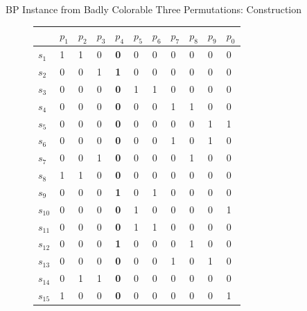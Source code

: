 \documentclass[xcolor=table]{beamer} %
\theoremstyle{definition}
\theoremstyle{plain}
\theoremstyle{remark}
\begin{document}
\begin{frame}{BP Instance from Badly Colorable Three Permutations: Construction}
\begin{figure}[!ht]\label{fig:34}
\centering
\tiny
\begin{tabular}{l|llllllllll}
& $p_1$ & $p_2$ & $p_3$ & \textbf{$p_4$} & $p_5$ & $p_6$ & $p_7$ & $p_8$ & $p_9$ & $p_0$ \\ \hline
$s_1$ & 1 & 1 & 0 & \textbf{0} & 0 & 0 & 0 & 0 & 0 & 0 \\
$s_2$ & 0 & 0 & 1 & \textbf{1} & 0 & 0 & 0 & 0 & 0 & 0 \\
$s_3$ & 0 & 0 & 0 & \textbf{0} & 1 & 1 & 0 & 0 & 0 & 0 \\
$s_4$ & 0 & 0 & 0 & \textbf{0} & 0 & 0 & 1 & 1 & 0 & 0 \\
$s_5$ & 0 & 0 & 0 & \textbf{0} & 0 & 0 & 0 & 0 & 1 & 1 \\ \hline
$s_6$ & 0 & 0 & 0 & \textbf{0} & 0 & 0 & 1 & 0 & 1 & 0 \\
$s_7$ & 0 & 0 & 1 & \textbf{0} & 0 & 0 & 0 & 1 & 0 & 0 \\
$s_8$ & 1 & 1 & 0 & \textbf{0} & 0 & 0 & 0 & 0 & 0 & 0 \\
$s_9$ & 0 & 0 & 0 & \textbf{1} & 0 & 1 & 0 & 0 & 0 & 0 \\
$s_{10}$ & 0 & 0 & 0 & \textbf{0} & 1 & 0 & 0 & 0 & 0 & 1 \\ \hline
$s_{11}$ & 0 & 0 & 0 & \textbf{0} & 1 & 1 & 0 & 0 & 0 & 0 \\
$s_{12}$ & 0 & 0 & 0 & \textbf{1} & 0 & 0 & 0 & 1 & 0 & 0 \\
$s_{13}$ & 0 & 0 & 0 & \textbf{0} & 0 & 0 & 1 & 0 & 1 & 0 \\
$s_{14}$ & 0 & 1 & 1 & \textbf{0} & 0 & 0 & 0 & 0 & 0 & 0 \\
$s_{15}$ & 1 & 0 & 0 & \textbf{0} & 0 & 0 & 0 & 0 & 0 & 1
\end{tabular}
\end{figure}


\end{frame}
\end{document}
